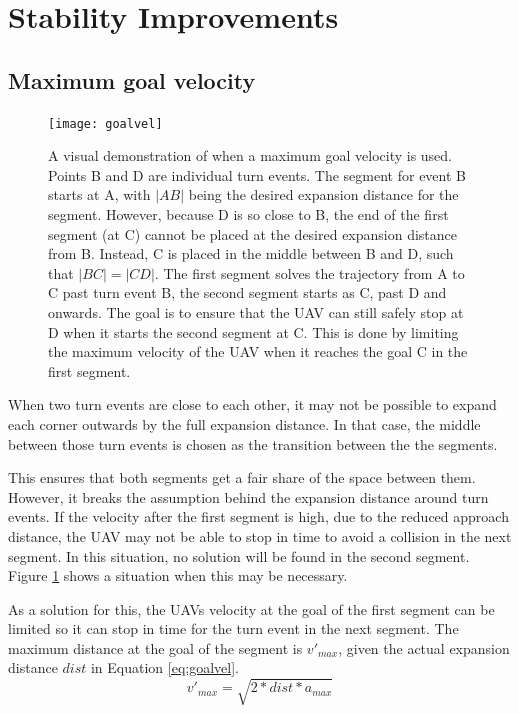 \section{Stability Improvements}

\subsection{Maximum goal velocity}
\label{subsec:maxgoalvel}
\begin{figure}[]
	\centering
	\texttt{[image: goalvel]}
	\caption[A scenario in which a maximum goal velocity is useful.]{A visual demonstration of when a maximum goal velocity is used. Points B and D are individual turn events. The segment for event B starts at A, with $|AB|$ being the desired expansion distance for the segment. However, because D is so close to B, the end of the first segment (at C) cannot be placed at the desired expansion distance from B. Instead, C is placed in the middle between B and D, such that $|BC|=|CD|$. The first segment solves the trajectory from A to C past turn event B, the second segment starts as C, past D and onwards. The goal is to ensure that the UAV can still safely stop at D when it starts the second segment at C. This is done by limiting the maximum velocity of the UAV when it reaches the goal C in the first segment.}
	\label{fig:max-goal-vel}
\end{figure}

When two turn events are close to each other, it may not be possible to expand each corner outwards by the full expansion distance. In that case, the middle between those turn events is chosen as the transition between the the segments.
\par
This ensures that both segments get a fair share of the space between them. However, it breaks the assumption behind the expansion distance around turn events. If the velocity after the first segment is high, due to the reduced approach distance, the UAV may not be able to stop in time to avoid a collision in the next segment. In this situation, no solution will be found in the second segment. Figure \ref{fig:max-goal-vel} shows a situation when this may be necessary.
\par
As a solution for this, the UAVs velocity at the goal of the first segment can be limited so it can stop in time for the turn event in the next segment. The maximum distance at the goal of the segment is $v'_{max}$, given the actual expansion distance $dist$ in Equation \ref{eq:goalvel}. 
\begin{equation}
\label{eq:goalvel}
v'_{max} = \sqrt{2 * dist * a_{max}}
\end{equation}

